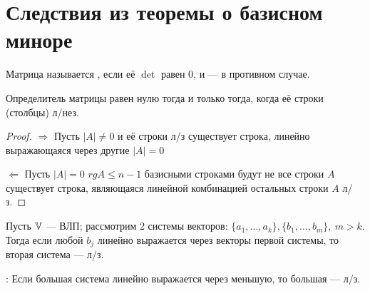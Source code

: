 \section{Следствия из теоремы о базисном миноре}
\begin{opred}
Матрица называется , если её $\det$ равен 0, и  --- в противном случае.
\end{opred}
\begin{theor}

Определитель матрицы равен нулю тогда и только тогда, когда её строки (столбцы) л/нез.
\end{theor}
\begin{proof}$\Longrightarrow$ Пусть $|A|\neq0$ и её строки л/з \then существует строка, линейно выражающаяся через другие \then $|A|=0$

$\Longleftarrow$ Пусть $|A|=0$ \then $rg A\leq n-1$ \then базисными строками будут не все строки $A$ \then существует строка, являющаяся линейной комбинацией остальных \then строки $A$ л/з.
\end{proof}
\begin{theor}

Пусть $\mathbb{V}$ --- ВЛП; рассмотрим 2 системы векторов: $\{a_1,\ldots,a_k\},\{b_1,\ldots,b_m\},\ m>k$. Тогда если любой $b_j$ линейно выражается через векторы первой системы, то вторая система --- л/з.

: Если большая система линейно выражается через меньшую, то большая --- л/з.
\end{theor}
